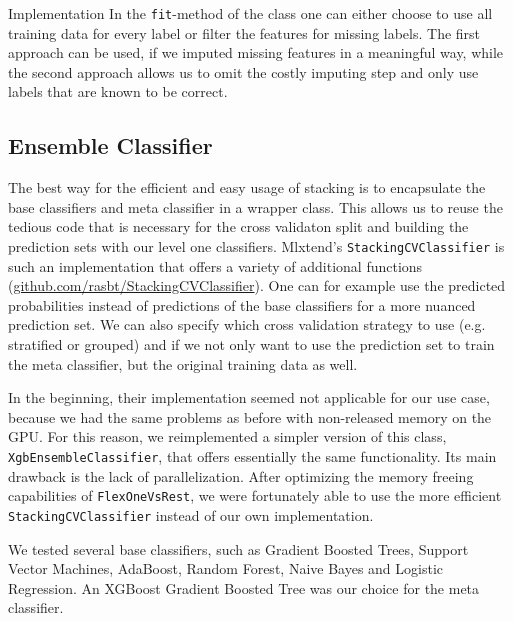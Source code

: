 \begin{section}{Implementation}
In the \texttt{fit}-method of the class one can either choose to use all training data for every label or filter the features for missing labels. The first approach can be used, if we imputed missing features in a meaningful way, while the second approach allows us to omit the costly imputing step and only use labels that are known to be correct.

\subsection{Ensemble Classifier}

The best way for the efficient and easy usage of stacking is to encapsulate the base classifiers and meta classifier in a wrapper class. This allows us to reuse the tedious code that is necessary for the cross validaton split and building the prediction sets with our level one classifiers. Mlxtend's \texttt{StackingCVClassifier} is such an implementation that offers a variety of additional functions (\href{http://rasbt.github.io/mlxtend/user_guide/classifier/StackingCVClassifier/}{github.com/rasbt/StackingCVClassifier}). One can for example use the predicted probabilities instead of predictions of the base classifiers for a more nuanced prediction set. We can also specify which cross validation strategy to use (e.g. stratified or grouped) and if we not only want to use the prediction set to train the meta classifier, but the original training data as well.

In the beginning, their implementation seemed not applicable for our use case, because we had the same problems as before with non-released memory on the GPU. For this reason, we reimplemented a simpler version of this class, \texttt{XgbEnsembleClassifier}, that offers essentially the same functionality. Its main drawback is the lack of parallelization. After optimizing the memory freeing capabilities of \texttt{FlexOneVsRest}, we were fortunately able to use the more efficient \texttt{StackingCVClassifier} instead of our own implementation.

We tested several base classifiers, such as Gradient Boosted Trees, Support Vector Machines, AdaBoost, Random Forest, Naive Bayes and Logistic Regression. An XGBoost Gradient Boosted Tree was our choice for the meta classifier.

\end{section}
